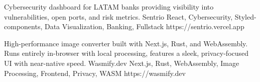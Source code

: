\documentclass[]{awesome-cv}
\begin{document}
\vspace{-5mm}

\begin{cventries}
	\cventry
	{Cybersecurity dashboard for LATAM banks providing visibility into vulnerabilities, open ports, and risk metrics.}
	{Sentrio}
	{React, Cybersecurity, Styled-components, Data Visualization, Banking, Fullstack}
	{https://sentrio.vercel.app}
	{}
	
	\vspace{-3mm}
	
	\cventry
	{High-performance image converter built with Next.js, Rust, and WebAssembly. Runs entirely in-browser with local processing, features a sleek, privacy-focused UI with near-native speed.}
	{Wasmify.dev}
	{Next.js, Rust, WebAssembly, Image Processing, Frontend, Privacy, WASM}
	{https://wasmify.dev}
	{}
\end{cventries}

\vspace{-2mm}
\ 
\end{document}
